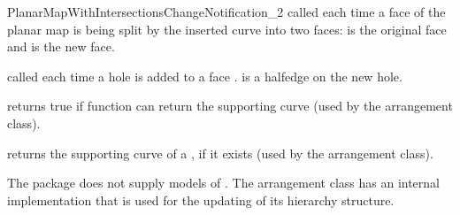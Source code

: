\begin{ccRefConcept}{PlanarMapWithIntersectionsChangeNotification_2}
  {called each time a face of the planar map is being split by
  the inserted curve into two faces:  is the
  original face and  is the new face.
  }

  {called each time a hole is added to a face .
   is a halfedge on the new hole.
  }

  {returns true if  function can return the
  supporting curve (used by the arrangement class).
  }

  {returns the supporting curve of a , if it exists
  (used by the arrangement class).
  }


\ccHasModels

  The package does not supply models of
  . The
  arrangement class has an internal implementation that is used for
  the updating of its hierarchy structure.

\end{ccRefConcept}

\ccRefPageEnd
